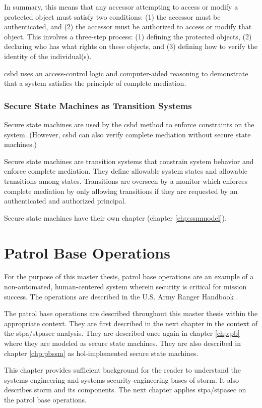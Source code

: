 \documentclass[../../main/main.tex]{subfiles}
\begin{document}
In summary, this means that any accessor attempting to access or modify a protected object must satisfy two conditions: (1) the accessor must be authenticated, and (2) the accessor must be authorized to access or modify that object.  This involves a three-step process: (1) defining the protected objects, (2) declaring who has what rights on these objects, and (3) defining how to verify the identity of the individual(s).  

\gls{csbd} uses an access-control logic and computer-aided reasoning to demonstrate that a system satisfies the principle of complete mediation.

\subsubsection{Secure State Machines as Transition Systems }\label{sssect:ssmts}
Secure state machines are used by the \gls{csbd} method to enforce constraints on the system.  (However, \gls{csbd} can also verify complete mediation without secure state machines.)

Secure state machines are transition systems that constrain system behavior and enforce complete mediation.  They define allowable system states and allowable transitions among states. Transitions are overseen by a monitor which enforces complete mediation by only allowing transitions if they are requested by an authenticated and authorized principal. 

Secure state machines have their own chapter (chapter \ref{chp:ssmmodel}).
\section{Patrol Base Operations}\label{sec:stormpb}
For the purpose of this master thesis, patrol base operations are an example of a non-automated, human-centered system wherein security is critical for mission success.  The operations are described in the U.S. Army Ranger Handbook \cite{rangermanual}.

The patrol base operations are described throughout this master thesis within the appropriate context.  They are first described in the next chapter in the context of the \gls{stpa}/\gls{stpasec} analysis.  They are described once again in chapter \ref{chp:pb} where they are modeled as secure state machines.  They are also described in chapter \ref{chp:pbssm} as \gls{hol}-implemented secure state machines.

This chapter provides sufficient background for the reader to understand the systems engineering and systems security engineering bases of \gls{storm}.  It also describes \gls{storm} and its components.  The next chapter applies  \gls{stpa}/\gls{stpasec} on the patrol base operations.
\end{document}
